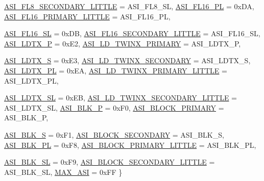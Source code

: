 \begin{DoxyCompactItemize}
\hyperlink{namespaceSparcISA_a6dd43f1311515252b283f56d7095a1f3ae0fea345f527e423390592969e7e92c7}{ASI\_\-FL8\_\-SECONDARY\_\-LITTLE} =  ASI\_\-FL8\_\-SL, 
\hyperlink{namespaceSparcISA_a6dd43f1311515252b283f56d7095a1f3ace440a7a17085ac994b38238870a2c78}{ASI\_\-FL16\_\-PL} =  0xDA, 
\hyperlink{namespaceSparcISA_a6dd43f1311515252b283f56d7095a1f3aabd73b3be9360723f2efdfa0e9d56225}{ASI\_\-FL16\_\-PRIMARY\_\-LITTLE} =  ASI\_\-FL16\_\-PL, 
\par
\hyperlink{namespaceSparcISA_a6dd43f1311515252b283f56d7095a1f3a07d6c71849fe3951cf142991030c5371}{ASI\_\-FL16\_\-SL} =  0xDB, 
\hyperlink{namespaceSparcISA_a6dd43f1311515252b283f56d7095a1f3a42b75acf3e9bc6a526e4ed6bfdf62385}{ASI\_\-FL16\_\-SECONDARY\_\-LITTLE} =  ASI\_\-FL16\_\-SL, 
\hyperlink{namespaceSparcISA_a6dd43f1311515252b283f56d7095a1f3af32971d8c277ea0154f95f5f543e971d}{ASI\_\-LDTX\_\-P} =  0xE2, 
\hyperlink{namespaceSparcISA_a6dd43f1311515252b283f56d7095a1f3a4bc0b35a923458ccc33d3debfa3df01d}{ASI\_\-LD\_\-TWINX\_\-PRIMARY} =  ASI\_\-LDTX\_\-P, 
\par
\hyperlink{namespaceSparcISA_a6dd43f1311515252b283f56d7095a1f3ad182422bf961efee4822d0239b7d2820}{ASI\_\-LDTX\_\-S} =  0xE3, 
\hyperlink{namespaceSparcISA_a6dd43f1311515252b283f56d7095a1f3ad70c65869baf607a333804b8d2ea10c4}{ASI\_\-LD\_\-TWINX\_\-SECONDARY} =  ASI\_\-LDTX\_\-S, 
\hyperlink{namespaceSparcISA_a6dd43f1311515252b283f56d7095a1f3aaa9022e150bbc8ad065a2b424b02053e}{ASI\_\-LDTX\_\-PL} =  0xEA, 
\hyperlink{namespaceSparcISA_a6dd43f1311515252b283f56d7095a1f3a3c6c8347ccae2d4c8e319a956ac5d8f8}{ASI\_\-LD\_\-TWINX\_\-PRIMARY\_\-LITTLE} =  ASI\_\-LDTX\_\-PL, 
\par
\hyperlink{namespaceSparcISA_a6dd43f1311515252b283f56d7095a1f3a041aa429ae2cfdf6ee0a1fd3493ad7a1}{ASI\_\-LDTX\_\-SL} =  0xEB, 
\hyperlink{namespaceSparcISA_a6dd43f1311515252b283f56d7095a1f3a0697a908e2df7fa518c83bac867e1b9f}{ASI\_\-LD\_\-TWINX\_\-SECONDARY\_\-LITTLE} =  ASI\_\-LDTX\_\-SL, 
\hyperlink{namespaceSparcISA_a6dd43f1311515252b283f56d7095a1f3a65c713483f85bea1ebffb2429260e493}{ASI\_\-BLK\_\-P} =  0xF0, 
\hyperlink{namespaceSparcISA_a6dd43f1311515252b283f56d7095a1f3a9e9b29b9732a677aca36f62fc4bd2e6c}{ASI\_\-BLOCK\_\-PRIMARY} =  ASI\_\-BLK\_\-P, 
\par
\hyperlink{namespaceSparcISA_a6dd43f1311515252b283f56d7095a1f3ac3c61d1c24ae825de82f318d638d50a4}{ASI\_\-BLK\_\-S} =  0xF1, 
\hyperlink{namespaceSparcISA_a6dd43f1311515252b283f56d7095a1f3a2c7dd53349a64f4d9eb584cf25aae841}{ASI\_\-BLOCK\_\-SECONDARY} =  ASI\_\-BLK\_\-S, 
\hyperlink{namespaceSparcISA_a6dd43f1311515252b283f56d7095a1f3a0ca8cc821a278e618167565794df8734}{ASI\_\-BLK\_\-PL} =  0xF8, 
\hyperlink{namespaceSparcISA_a6dd43f1311515252b283f56d7095a1f3a6d91906b069ec784c6e70ff4cce72579}{ASI\_\-BLOCK\_\-PRIMARY\_\-LITTLE} =  ASI\_\-BLK\_\-PL, 
\par
\hyperlink{namespaceSparcISA_a6dd43f1311515252b283f56d7095a1f3ade37eebfdc76d9c9e0490ec150f51770}{ASI\_\-BLK\_\-SL} =  0xF9, 
\hyperlink{namespaceSparcISA_a6dd43f1311515252b283f56d7095a1f3a11b0135c5ac3933eff9959cfa208bc1f}{ASI\_\-BLOCK\_\-SECONDARY\_\-LITTLE} =  ASI\_\-BLK\_\-SL, 
\hyperlink{namespaceSparcISA_a6dd43f1311515252b283f56d7095a1f3afda8a3454c74013a9fa9f7db69c29467}{MAX\_\-ASI} =  0xFF
 \}
\end{DoxyCompactItemize}
